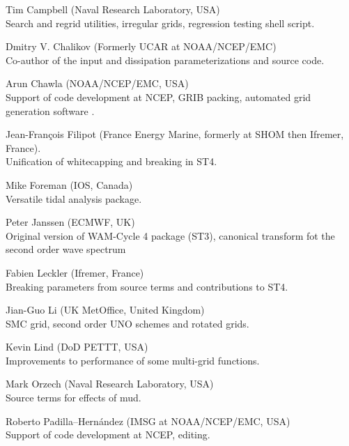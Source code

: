 \begin{list}{\ldots}{ }
\item [Tim Campbell] (Naval Research Laboratory, USA)\\ 
  Search and regrid utilities, irregular grids, regression testing
  shell script.

\item [Dmitry V. Chalikov] (Formerly UCAR at NOAA/NCEP/EMC) \\ Co-author of the
  \cite{tol:JPO96} input and dissipation parameterizations and source code.

\item [Arun Chawla](NOAA/NCEP/EMC, USA) \\
  Support of code development at NCEP, GRIB packing, automated grid generation
  software \citep{tol:MMAB07a, tol:OMOD08a}.

\item [Jean-Fran{\c c}ois Filipot] (France Energy Marine, formerly at SHOM then Ifremer, France).\\
  Unification of whitecapping and breaking in ST4. 

\item [Mike Foreman]  (IOS, Canada) \\
  Versatile tidal analysis package. 

\item [Peter Janssen] (ECMWF, UK) \\
  Original version of WAM-Cycle 4 package (ST3), canonical transform fot the second order wave spectrum 

\item [Fabien Leckler] (Ifremer, France) \\
  Breaking parameters from source terms and contributions to ST4.

\item [Jian-Guo Li] (UK MetOffice, United Kingdom) \\
  SMC grid, second order UNO schemes and rotated grids.

\item [Kevin Lind]  (DoD PETTT, USA)\\ 
  Improvements to performance of some multi-grid functions.

\item [Mark Orzech]  (Naval Research Laboratory, USA)\\ 
  Source terms for effects of mud.

\item [Roberto Padilla--Hern\'andez]  (IMSG at NOAA/NCEP/EMC, USA)\\ 
  Support of code development at NCEP, editing.
   

\end{list}
